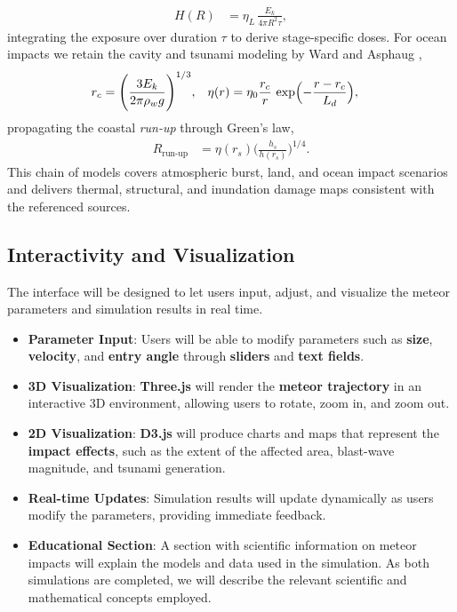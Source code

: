 \documentclass[conference]{IEEEtran}
\begin{document}
\begin{itemize}
\begin{align}
		      H(R) & = \eta_L\,\frac{E_k}{4 \pi R^2 \tau},
	      \end{align}
	      integrating the exposure over duration $\tau$ to derive stage-specific
	      doses. For ocean impacts we retain the cavity and tsunami modeling by Ward
	      and Asphaug \cite{ward2000},
	      \begin{align}
		      r_c     & = \Biggl(\frac{3 E_k}{2 \pi \rho_w g}\Biggr)^{1/3}, &
		      \eta(r) & = \eta_0 \frac{r_c}{r}\,
		      \exp\Bigl(-\frac{r - r_c}{L_d}\Bigr),
	      \end{align}
	      propagating the coastal \textit{run-up} through Green's law,
	      \begin{align}
		      R_{\text{run-up}} & = \eta(r_s)
		      \Biggl(\frac{h_s}{h(r_s)}\Biggr)^{1/4}.
	      \end{align}
	      This chain of models covers atmospheric burst, land, and ocean impact
	      scenarios and delivers thermal, structural, and inundation damage maps
	      consistent with the referenced sources.
\end{itemize}

\subsection{Interactivity and Visualization}
The interface will be designed to let users input, adjust, and visualize the
meteor parameters and simulation results in real time.
\begin{itemize}
	\item \textbf{Parameter Input}: Users will be able to modify parameters such as
	      \textbf{size}, \textbf{velocity}, and \textbf{entry angle} through
	      \textbf{sliders} and \textbf{text fields}.
	\item \textbf{3D Visualization}: \textbf{Three.js} will render the
	      \textbf{meteor trajectory} in an interactive 3D environment, allowing
	      users to rotate, zoom in, and zoom out.
	\item \textbf{2D Visualization}: \textbf{D3.js} will produce charts and maps
	      that represent the \textbf{impact effects}, such as the extent of the
	      affected area, blast-wave magnitude, and tsunami generation.
	\item \textbf{Real-time Updates}: Simulation results will update dynamically as
	      users modify the parameters, providing immediate feedback.
	\item \textbf{Educational Section}: A section with scientific information on
	      meteor impacts will explain the models and data used in the simulation.
	      As both simulations are completed, we will describe the relevant
	      scientific and mathematical concepts employed.
\end{itemize}
\end{document}
